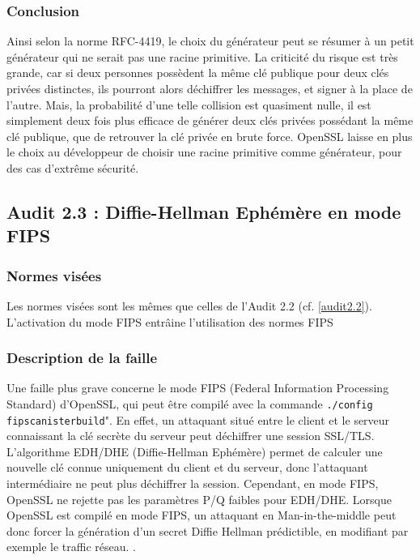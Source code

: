 		\subsubsection{Conclusion}

		Ainsi selon la norme RFC-4419, le choix du générateur peut se résumer à un petit générateur qui ne serait pas une racine primitive. La criticité du risque est très grande, car si deux personnes possèdent la même clé publique pour deux clés privées distinctes, ils pourront alors déchiffrer les messages, et signer à la place de l'autre. Mais, la probabilité d'une telle collision est quasiment nulle, il est simplement deux fois plus efficace de générer deux clés privées possédant la même clé publique, que de retrouver la clé privée en brute force.
		OpenSSL laisse en plus le choix au développeur de choisir une racine primitive comme générateur, pour des cas d'extrême sécurité.
		
	\subsection{Audit 2.3 : Diffie-Hellman Ephémère en mode FIPS}
		\subsubsection{Normes visées}

		Les normes visées sont les mêmes que celles de l'Audit 2.2 (cf. \ref{audit2.2}).\\
		L'activation du mode FIPS entrâine l'utilisation des normes FIPS \cite{fips186-4} \cite{fips140-2}

		\subsubsection{Description de la faille}
	
		Une faille plus grave concerne le mode FIPS (Federal Information Processing Standard) d'OpenSSL, qui peut être compilé avec la commande \texttt{./config fipscanisterbuild}". En effet, un attaquant situé entre le client et le serveur connaissant la clé secrète du serveur peut déchiffrer une session SSL/TLS. \\
	
		L'algorithme EDH/DHE (Diffie-Hellman Ephémère) permet de calculer une nouvelle clé connue uniquement du client et du serveur, donc l'attaquant intermédiaire ne peut plus déchiffrer la session. Cependant, en mode FIPS, OpenSSL ne rejette pas les paramètres P/Q faibles pour EDH/DHE. Lorsque OpenSSL est compilé en mode FIPS, un attaquant en Man-in-the-middle peut donc forcer la génération d'un secret Diffie Hellman prédictible, en modifiant par exemple le traffic réseau. \cite{vigilance-vul-10585} \cite{CVE-2011-5095}.

